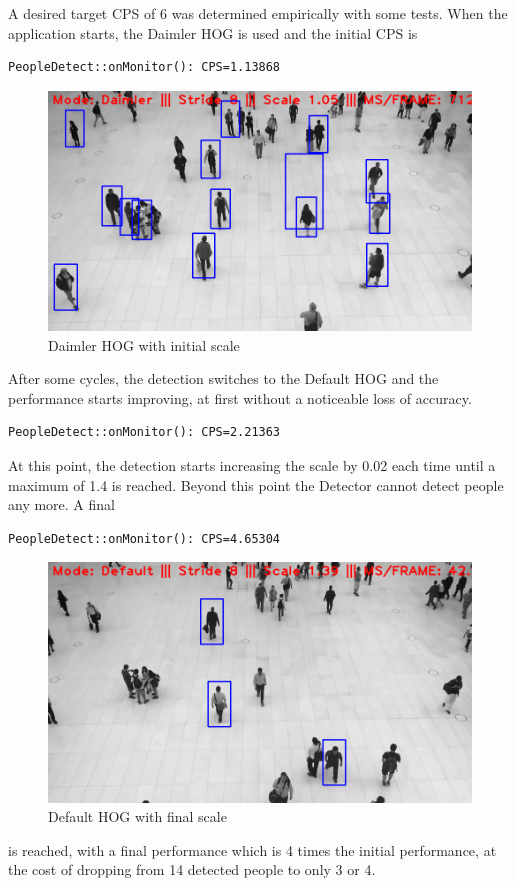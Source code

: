 A desired target CPS of 6 was determined empirically with some tests.
When the application starts, the Daimler HOG is used and the initial CPS is
\begin{verbatim}
PeopleDetect::onMonitor(): CPS=1.13868
\end{verbatim}
\begin{figure}
\centering
\includegraphics[width=1.0\textwidth]{peopledetect-0001.png}
\caption{\label{fig:peopledetect-0001}Daimler HOG with initial scale}
\end{figure}
After some cycles, the detection switches to the Default HOG and the performance
starts improving, at first without a noticeable loss of accuracy.
\begin{verbatim}
PeopleDetect::onMonitor(): CPS=2.21363
\end{verbatim}
At this point, the detection starts increasing the scale by 0.02 each time
until a maximum of 1.4 is reached. Beyond this point the Detector cannot detect
people any more.
A final
\begin{verbatim}
PeopleDetect::onMonitor(): CPS=4.65304
\end{verbatim}
\begin{figure}
\centering
\includegraphics[width=1.0\textwidth]{peopledetect-0019.png}
\caption{\label{fig:peopledetect-0019}Default HOG with final scale}
\end{figure}
is reached, with a final performance which is 4 times the initial performance, at the
cost of dropping from 14 detected people to only 3 or 4.

